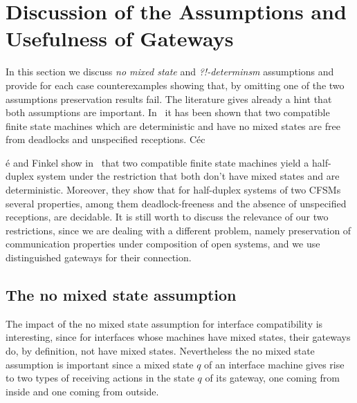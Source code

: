 

\section{Discussion  of the Assumptions and Usefulness of Gateways}
\label{sec:nomix}

In this section we discuss {\em no mixed state} and {\em ?!-determinsm} assumptions and provide for each case counterexamples showing that, by omitting one of the two assumptions preservation results fail. The literature gives already a hint that both assumptions are important.
In~\cite{GMY80} it has been shown that two compatible finite state machines which are deterministic and have no mixed states are free from deadlocks and unspecified receptions. 
C{\'{e}}c{\'{e} and Finkel show in~\cite{CF05} that two compatible finite state machines
yield a half-duplex system under the restriction that both don't have mixed states and are deterministic.
Moreover, they show that for half-duplex systems of two CFSMs several properties, among them deadlock-freeness and the absence of unspecified receptions, are decidable. It is still worth to discuss the relevance
of our two restrictions, since we are dealing with a different problem, namely preservation of communication properties under composition of open systems, and we use distinguished gateways for their connection.


\subsection{The no mixed state assumption}
\label{sec:nomix-assumption}

The impact of the no mixed state assumption for interface compatibility is interesting,
since for interfaces whose machines have mixed states, their gateways do, by definition, not have mixed states.
Nevertheless the no mixed state assumption is important since a mixed state $q$ of an interface machine
gives rise to two types of receiving actions in the state $q$ of its gateway, one coming from inside and one coming from outside. %


}
